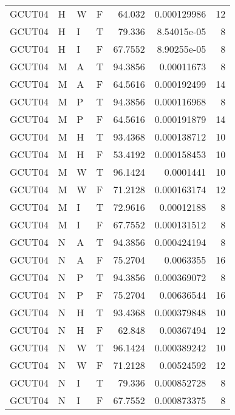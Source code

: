 \begin{table}[htb!]
{\begin{tabular}{llllrrr}
            GCUT04   & H     & W     & F          & 64.032     & 0.000129986 & 12       \\
            GCUT04   & H     & I     & T          & 79.336     & 8.54015e-05 & 8        \\
            GCUT04   & H     & I     & F          & 67.7552    & 8.90255e-05 & 8        \\
            GCUT04   & M     & A     & T          & 94.3856    & 0.00011673  & 8        \\
            GCUT04   & M     & A     & F          & 64.5616    & 0.000192499 & 14       \\
            GCUT04   & M     & P     & T          & 94.3856    & 0.000116968 & 8        \\
            GCUT04   & M     & P     & F          & 64.5616    & 0.000191879 & 14       \\
            GCUT04   & M     & H     & T          & 93.4368    & 0.000138712 & 10       \\
            GCUT04   & M     & H     & F          & 53.4192    & 0.000158453 & 10       \\
            GCUT04   & M     & W     & T          & 96.1424    & 0.0001441   & 10       \\
            GCUT04   & M     & W     & F          & 71.2128    & 0.000163174 & 12       \\
            GCUT04   & M     & I     & T          & 72.9616    & 0.00012188  & 8        \\
            GCUT04   & M     & I     & F          & 67.7552    & 0.000131512 & 8        \\
            GCUT04   & N     & A     & T          & 94.3856    & 0.000424194 & 8        \\
            GCUT04   & N     & A     & F          & 75.2704    & 0.0063355   & 16       \\
            GCUT04   & N     & P     & T          & 94.3856    & 0.000369072 & 8        \\
            GCUT04   & N     & P     & F          & 75.2704    & 0.00636544  & 16       \\
            GCUT04   & N     & H     & T          & 93.4368    & 0.000379848 & 10       \\
            GCUT04   & N     & H     & F          & 62.848     & 0.00367494  & 12       \\
            GCUT04   & N     & W     & T          & 96.1424    & 0.000389242 & 10       \\
            GCUT04   & N     & W     & F          & 71.2128    & 0.00524592  & 12       \\
            GCUT04   & N     & I     & T          & 79.336     & 0.000852728 & 8        \\
            GCUT04   & N     & I     & F          & 67.7552    & 0.000873375 & 8        \\
            \hline
        \end{tabular}
    }{
    }
\end{table} 
